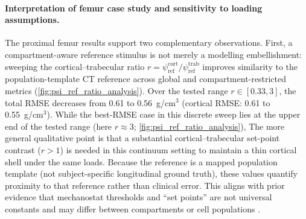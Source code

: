 \paragraph{Interpretation of femur case study and sensitivity to loading assumptions.}
The proximal femur results support two complementary observations.
First, a compartment-aware reference stimulus is not merely a modelling embellishment: sweeping the cortical--trabecular ratio $r=\psi_{\mathrm{ref}}^{\mathrm{cort}}/\psi_{\mathrm{ref}}^{\mathrm{trab}}$ improves similarity to the population-template CT reference across global and compartment-restricted metrics (\cref{fig:psi_ref_ratio_analysis}).
Over the tested range $r\in[0.33,3]$, the total RMSE decreases from 0.61 to 0.56~g/cm$^3$ (cortical RMSE: 0.61 to 0.55~g/cm$^3$).
While the best-RMSE case in this discrete sweep lies at the upper end of the tested range (here $r\approx 3$; \cref{fig:psi_ref_ratio_analysis}), 
The more general qualitative point is that a substantial cortical--trabecular set-point contrast ($r>1$) is needed in this continuum setting to maintain a thin cortical shell under the same loads.
Because the reference is a mapped population template (not subject-specific longitudinal ground truth), these values quantify proximity to that reference rather than clinical error.
This aligns with prior evidence that mechanostat thresholds and ``set points'' are not universal constants and may differ between compartments or cell populations \cite{Frost1992_SetPointsOsteoporosis,Mullender1998_SetPointTrabecularArchitecture,Yang2021_CancellousGreaterThreshold,Schulte2013_LocalMechanicalStimuli}.
